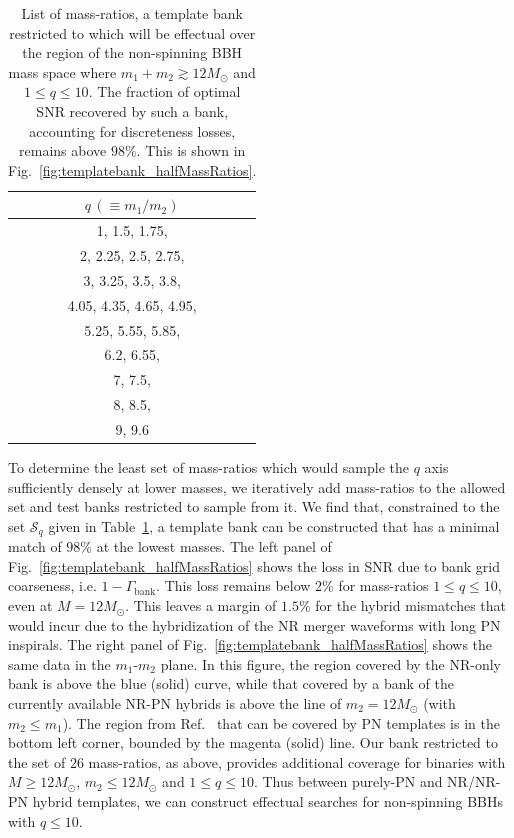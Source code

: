 \begin{table}
\begin{tabular}{| c |}
\hline
$q\,(\equiv m_1/m_2)$ \\ \hline
1, 1.5, 1.75, \\
2, 2.25, 2.5, 2.75, \\
3, 3.25, 3.5, 3.8, \\
4.05, 4.35, 4.65, 4.95, \\
5.25, 5.55, 5.85, \\
6.2, 6.55, \\
7, 7.5, \\
8, 8.5, \\
9, 9.6 \\
\hline
\end{tabular}
\caption{List of mass-ratios, a template bank restricted to which will be effectual
over the region of the non-spinning BBH mass space where $m_1+m_2\gtrsim 12M_\odot$
and $1\leq q\leq 10$. The fraction of optimal SNR recovered by such a bank,
accounting for discreteness losses, remains above $98\%$. This is shown in
Fig.~\ref{fig:templatebank_halfMassRatios}.}
\label{table:fullqlist}
\end{table}
To determine the least set of mass-ratios which would sample the $q$ axis 
sufficiently densely at lower masses, we iteratively add mass-ratios to the 
allowed set and test banks restricted to sample from it. We find that, 
constrained to the set $\mathcal{S}_q$ given in Table~\ref{table:fullqlist},
a template bank can be constructed that has a minimal match of $98\%$
at the lowest masses. The left panel of Fig.~\ref{fig:templatebank_halfMassRatios}
shows the loss in SNR due to bank grid coarseness, i.e. $1-\Gamma_\mathrm{bank}$. 
This loss remains below $2\%$ for mass-ratios $1\leq q\leq 10$, even at 
$M=12M_\odot$. This 
leaves a margin of $1.5\%$ for the hybrid mismatches that would incur due to 
the hybridization of the NR merger waveforms with long PN inspirals. The right 
panel of Fig.~\ref{fig:templatebank_halfMassRatios} shows the same data in the 
$m_1$-$m_2$ plane. In this figure, 
the region covered by the NR-only bank is above the blue (solid) curve, while 
that covered by a bank of the currently available NR-PN hybrids is above the
line of $m_2 = 12M_\odot$ (with $m_2\leq m_1$). The region from 
Ref.~\cite{Brown:2012nn,CompTemplates2009} that can be covered by PN templates 
is in the bottom
left corner, bounded by the magenta (solid) line. Our bank restricted to the
set of $26$ mass-ratios, as above, provides additional coverage for binaries
with $M\geq 12M_\odot$, $m_2\leq 12M_\odot$ and $1\leq q\leq 10$.
Thus between purely-PN and NR/NR-PN hybrid templates, we can construct 
effectual searches for non-spinning BBHs with $q\leq 10$.

